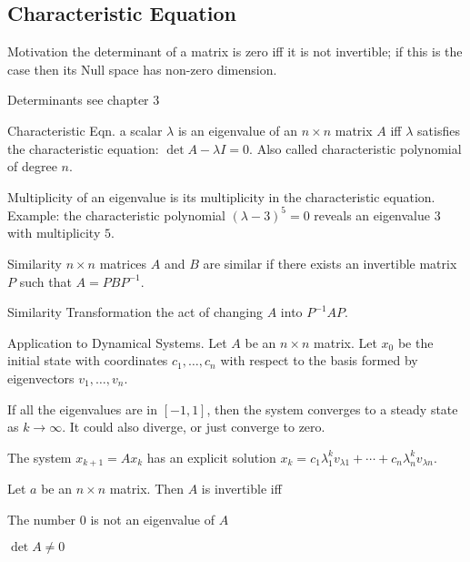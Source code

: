 \begin{card}
    \subsection{Characteristic Equation}

    \begin{compactdesc}
    \item[Motivation] the determinant of a matrix is zero iff it is not
        invertible; if this is the case then its Null space has non-zero
        dimension.
    \item[Determinants] see chapter 3
    \item[Characteristic Eqn.] a scalar $\lambda$ is an eigenvalue of an
        $n \times n$ matrix $A$ iff $\lambda$ satisfies the characteristic
        equation: $\det A - \lambda I = 0$. Also called characteristic
        polynomial of degree $n$.
    \item[Multiplicity] of an eigenvalue is its multiplicity in the
        characteristic equation. Example: the characteristic polynomial
        $(\lambda - 3)^5 = 0$ reveals an eigenvalue $3$ with multiplicity $5$.
    \item[Similarity] $n \times n$ matrices $A$ and $B$ are similar if
        there exists an invertible matrix $P$ such that $A = PBP^{-1}$.
    \item[Similarity Transformation] the act of changing $A$ into $P^{-1}AP$.
    \item[Application to Dynamical] Systems. Let $A$ be an $n \times n$ matrix.
        Let $x_0$ be the initial state with
        coordinates $c_1, \dotsc, c_n$ with respect
        to the basis formed by eigenvectors $v_1, \dotsc, v_n$.

        If all the eigenvalues are in $[-1,1]$, then the system converges to a
        steady state as $k \to \infty$.
        It could also diverge, or just converge to zero.

        The system $x_{k+1} = Ax_k$ has an explicit solution
        $x_k = c_1 \lambda_1^k v_{\lambda 1} + \dotsb + c_n \lambda_n^k v_{\lambda n}$.
    \end{compactdesc}

    \begin{theorem}
    Let $a$ be an $n \times n$ matrix. Then $A$ is invertible iff
    \begin{compactenum}
    \item The number $0$ is not an eigenvalue of $A$
    \item $\det A \neq 0$
    \end{compactenum}
    \end{theorem}


\end{card}
